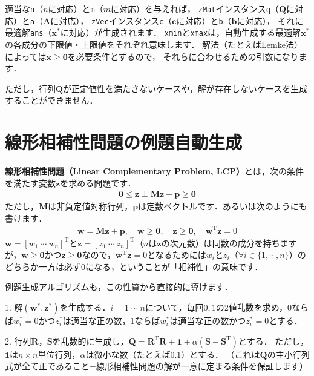 ﻿\documentclass[a4paper]{jsarticle}
\begin{document}
適当な\verb|n|（$n$に対応）と\verb|m|（$m$に対応）を与えれば，
\verb|zMat|インスタンス\verb|q|（$\boldsymbol{Q}$に対応）と\verb|a|（$\boldsymbol{A}$に対応），
\verb|zVec|インスタンス\verb|c|（$\boldsymbol{c}$に対応）と\verb|b|（$\boldsymbol{b}$に対応），
それに最適解\verb|ans|（$\boldsymbol{x}^{*}$に対応）が生成されます．
\verb|xmin|と\verb|xmax|は，自動生成する最適解$\boldsymbol{x}^{*}$の各成分の下限値・上限値をそれぞれ意味します．
解法（たとえばLemke法）によっては$\boldsymbol{x}\geq\boldsymbol{0}$を必要条件とするので，
それらに合わせるための引数になります．

ただし，行列$\boldsymbol{Q}$が正定値性を満たさないケースや，解が存在しないケースを生成することができません．



\section{線形相補性問題の例題自動生成}

{\bf 線形相補性問題（Linear Complementary Problem, LCP）}とは，次の条件を満たす変数$\boldsymbol{z}$を求める問題です．
\begin{align*}
\boldsymbol{0}\leq\boldsymbol{z}\perp\boldsymbol{M}\boldsymbol{z}+\boldsymbol{p}\geq\boldsymbol{0}
\end{align*}
ただし，$\boldsymbol{M}$は非負定値対称行列，$\boldsymbol{p}$は定数ベクトルです．あるいは次のようにも書けます．
\begin{align*}
\boldsymbol{w}=\boldsymbol{M}\boldsymbol{z}+\boldsymbol{p},\quad
\boldsymbol{w}\geq\boldsymbol{0},\quad
\boldsymbol{z}\geq\boldsymbol{0},\quad
\boldsymbol{w}^{\mathrm{T}}\boldsymbol{z}=0
\end{align*}
$\boldsymbol{w}=[w_{1}~\cdots~w_{n}]^{\mathrm{T}}$と$\boldsymbol{z}=[z_{1}~\cdots~z_{n}]^{\mathrm{T}}$（$n$は$\boldsymbol{z}$の次元数）は同数の成分を持ちますが，$\boldsymbol{w}\geq\boldsymbol{0}$かつ$\boldsymbol{z}\geq\boldsymbol{0}$なので，$\boldsymbol{w}^{\mathrm{T}}\boldsymbol{z}=0$となるためには$w_{i}$と$z_{i}$（$\forall i\in\{1,\cdots,n\}$）のどちらか一方は必ず0になる，ということが「相補性」の意味です．

例題生成アルゴリズムも，この性質から直接的に導けます．

1. 解$(\boldsymbol{w}^{*},\boldsymbol{z}^{*})$を生成する．$i=1\sim n$について，毎回$0, 1$の2値乱数を求め，$0$ならば$w_{i}^{*}=0$かつ$z_{i}^{*}$は適当な正の数，$1$ならば$w_{i}^{*}$は適当な正の数かつ$z_{i}^{*}=0$とする．

2. 行列$\boldsymbol{R}$，$\boldsymbol{S}$を乱数的に生成し，$\boldsymbol{Q}=\boldsymbol{R}^{\mathrm{T}}\boldsymbol{R}+\boldsymbol{1}+\alpha(\boldsymbol{S}-\boldsymbol{S}^{\mathrm{T}})$とする．
ただし，$\boldsymbol{1}$は$n\times n$単位行列，$\alpha$は微小な数（たとえば$0.1$）とする．
（これは$\boldsymbol{Q}$の主小行列式が全て正であること=線形相補性問題の解が一意に定まる条件を保証します）
\end{document}
